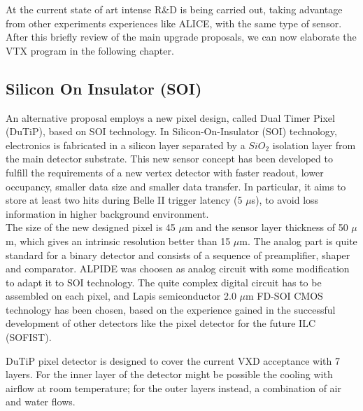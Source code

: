 At the current state of art intense R\&D is being carried out, taking advantage from other experiments experiences like ALICE, with the same type of sensor.\\

After this briefly review of the main upgrade proposals, we can now elaborate the VTX program in the following chapter.

\begin{comment}
Among all these options that we sift through, the last one has been chosen for the future upgrade of the vertex detector. The first two proposals have now been abandoned, the one that contemplates the use of the SOI technology instead, is considered as a backup option. \\
\end{comment}


\subsection{Silicon On Insulator (SOI)}

An alternative proposal employs a new pixel design, called Dual Timer Pixel (DuTiP), based on SOI technology. In Silicon-On-Insulator (SOI) technology, electronics is fabricated in a silicon layer separated by a $SiO_{2}$ isolation layer from the main detector substrate.
This new sensor concept has been developed to fulfill the requirements of a new vertex detector with faster readout, lower occupancy, smaller data size and smaller data transfer. In particular, it aims to store at least two hits during Belle II trigger latency (5 $\mu$s), to avoid loss information in higher background environment. \\

The size of the new designed pixel is 45 $\mu$m and the sensor layer thickness of 50 $\mu$m, which gives an intrinsic resolution better than 15 $\mu$m. The analog part is quite standard for a binary detector and consists of a sequence of preamplifier, shaper and comparator.  ALPIDE was choosen as analog circuit with some modification to adapt it to SOI technology. 
The quite complex digital circuit has to be assembled on each pixel, and Lapis semiconductor 2.0 $\mu$m FD-SOI CMOS technology has been chosen, based on the experience gained in the successful development of other detectors like the pixel detector for the future ILC (SOFIST).

DuTiP pixel detector is designed to cover the current VXD acceptance with 7 layers. For the inner layer of the detector might be possible the cooling with airflow at room temperature; for the outer layers instead, a combination of air and water flows.

